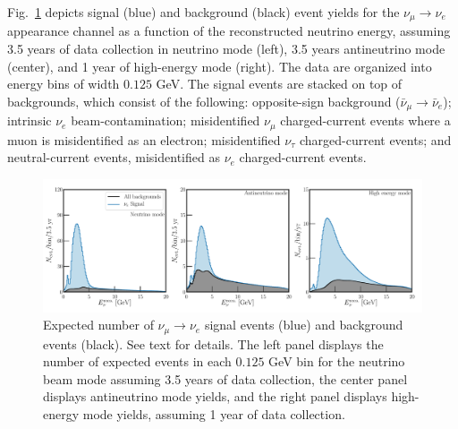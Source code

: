 \documentclass[aps,prd,onecolumn,nofootinbib,superscriptaddress, 11pt]{revtex4}
\begin{document}
Fig.~\ref{fig:AppYields} depicts signal (blue) and background (black) event yields for the $\nu_\mu \to \nu_e$ appearance channel as a function of the reconstructed neutrino energy, assuming 3.5 years of data collection in neutrino mode (left), 3.5 years antineutrino mode (center), and 1 year of high-energy mode (right). The data are organized into energy bins of width $0.125$ GeV. The signal events are stacked on top of backgrounds, which consist of the following: opposite-sign background ($\bar{\nu}_\mu \to \bar{\nu}_e$); intrinsic $\nu_e$ beam-contamination; misidentified $\nu_\mu$ charged-current events where a muon is misidentified as an electron; misidentified $\nu_\tau$ charged-current events; and neutral-current events, misidentified as $\nu_e$ charged-current events.
\begin{figure}[ht]
\begin{center}
\includegraphics[width=\textwidth]{AppEventYields_Stack.pdf}
\caption{Expected number of $\nu_\mu \to \nu_e$ signal events (blue) and background events (black). See text for details. The left panel displays the number of expected events in each $0.125$ GeV bin for the neutrino beam mode assuming 3.5 years of data collection, the center panel displays antineutrino mode yields, and the right panel displays high-energy mode yields, assuming 1 year of data collection.}
\label{fig:AppYields}
\end{center}
\end{figure}
\end{document}
